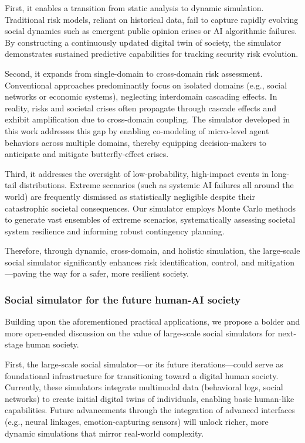 First, it enables a transition from static analysis to dynamic simulation. Traditional risk models, reliant on historical data, fail to capture rapidly evolving social dynamics such as emergent public opinion crises or AI algorithmic failures. By constructing a continuously updated digital twin of society, the simulator demonstrates sustained predictive capabilities for tracking security risk evolution.  

Second, it expands from single-domain to cross-domain risk assessment. Conventional approaches predominantly focus on isolated domains (e.g., social networks or economic systems), neglecting interdomain cascading effects. In reality, risks and societal crises often propagate through cascade effects and exhibit amplification due to cross-domain coupling. The simulator developed in this work addresses this gap by enabling co-modeling of micro-level agent behaviors across multiple domains, thereby equipping decision-makers to anticipate and mitigate butterfly-effect crises. 

Third,  it addresses the oversight of low-probability, high-impact events in long-tail distributions. Extreme scenarios (such as systemic AI failures all around the world) are frequently dismissed as statistically negligible despite their catastrophic societal consequences. Our simulator employs Monte Carlo methods to generate vast ensembles of extreme scenarios, systematically assessing societal system resilience and informing robust contingency planning.  

Therefore, through dynamic, cross-domain, and holistic simulation, the large-scale social simulator significantly enhances risk identification, control, and mitigation—paving the way for a safer, more resilient society.

\subsubsection{Social simulator for the future human-AI society}

Building upon the aforementioned practical applications, we propose a bolder and more open-ended discussion on the value of large-scale social simulators for next-stage human society.  

First, the large-scale social simulator—or its future iterations—could serve as foundational infrastructure for transitioning toward a digital human society. Currently, these simulators integrate multimodal data (behavioral logs, social networks) to create initial digital twins of individuals, enabling basic human-like capabilities. Future advancements through the integration of advanced interfaces (e.g., neural linkages, emotion-capturing sensors) will unlock richer, more dynamic simulations that mirror real-world complexity.  

